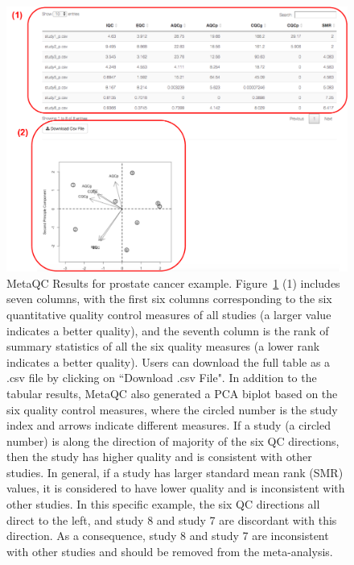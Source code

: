 \begin{figure}[H]
\begin{center}
\includegraphics[scale=0.65]{./figure/metaQC/metaQCresult_Prostate.pdf}
\caption{MetaQC Results for prostate cancer example.
Figure~\ref{fig:MetaQCresult} {\color{red} (1)} includes seven columns, 
with the first six columns corresponding to the six quantitative quality control measures of all studies (a larger value indicates a better quality), and the seventh column is the rank of summary statistics of all the six quality measures (a lower rank indicates a better quality). 
Users can download the full table as a .csv file by clicking on ``Download .csv File". 
In addition to the tabular results, MetaQC also generated a PCA biplot based on the six quality control measures, 
where the circled number is the study index and arrows indicate different measures. 
If a study (a circled number) is along the direction of majority of the six QC directions, then the study has higher quality and is consistent with other studies.
In general, if a study has larger standard mean rank (SMR) values, 
it is considered to have lower quality and is inconsistent with other studies.
In this specific example, the six QC directions all direct to the left, 
and study 8 and study 7 are discordant with this direction.
As a consequence, study 8 and study 7 are inconsistent with other studies and should be removed from the meta-analysis.
}
\label{fig:MetaQCresult}
\end{center}
\end{figure}


